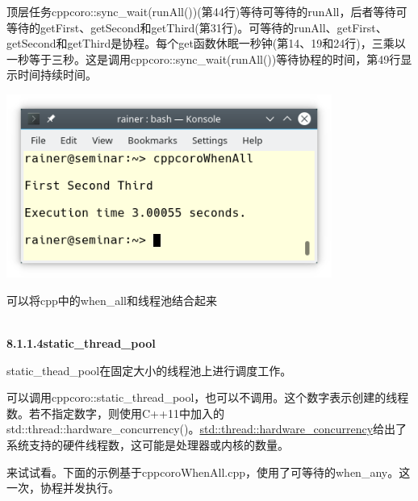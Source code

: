 顶层任务cppcoro::sync\_wait(runAll())(第44行)等待可等待的runAll，后者等待可等待的getFirst、getSecond和getThird(第31行)。可等待的runAll、getFirst、getSecond和getThird是协程。每个get函数休眠一秒钟(第14、19和24行)，三乘以一秒等于三秒。这是调用cppcoro::sync\_wait(runAll())等待协程的时间，第49行显示时间持续时间。

\begin{center}
\includegraphics[width=0.8\textwidth]{content/5/chapter8/images/5.png}\\
\end{center}

可以将cpp中的when\_all和线程池结合起来

\hspace*{\fill} \\ %
\noindent
\textbf{8.1.1.4\hspace{0.2cm}static\_thread\_pool}

static\_thead\_pool在固定大小的线程池上进行调度工作。

可以调用cppcoro::static\_thread\_pool，也可以不调用。这个数字表示创建的线程数。若不指定数字，则使用C++11中加入的std::thread::hardware\_concurrency()。\href{https://en.cppreference.com/w/cpp/thread/thread/hardware_concurrency}{std::thread::hardware\_concurrency}给出了系统支持的硬件线程数，这可能是处理器或内核的数量。

来试试看。下面的示例基于cppcoroWhenAll.cpp，使用了可等待的when\_any。这一次，协程并发执行。

